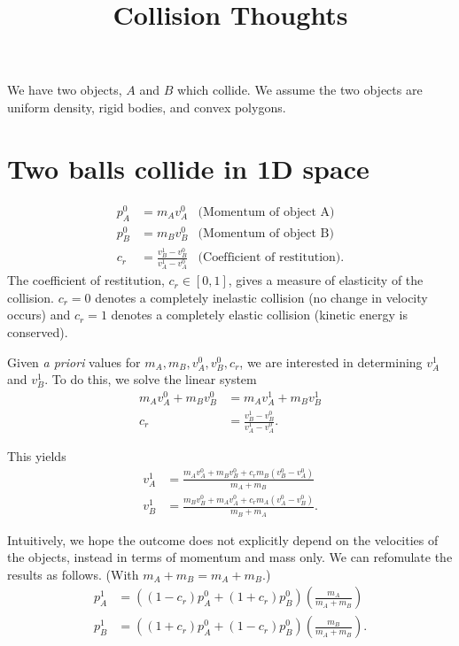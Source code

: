 \documentclass[a4paper,11pt, oneside]{article}
\title{Collision Thoughts}
\newcommand{\mtot}{m_A + m_B}
\begin{document}
\maketitle

We have two objects, $A$ and $B$ which collide.  We assume the two objects are uniform density, rigid bodies, and convex polygons.

\section{Two balls collide in 1D space}
\begin{align*}
    p_A^{0} &= m_Av_A^0 & \text{(Momentum of object A)}\\
    p_B^{0} &= m_Bv_B^0 & \text{(Momentum of object B)}\\
    c_r &= \frac{v_B^1 - v_B^0}{v_A^1 - v_A^0}  &\text{(Coefficient of restitution)}.
\end{align*}
The coefficient of restitution, $c_r\in[0,1]$, gives a measure of elasticity of the collision. $c_r = 0$ denotes a completely inelastic collision (no change in velocity occurs) and $c_r = 1$ denotes a completely elastic collision (kinetic energy is conserved).

Given \emph{a priori} values for $m_A, m_B, v_A^0, v_B^0, c_r$, we are interested in determining $v_A^1$ and $v_B^1$.  To do this, we solve the linear system
\begin{align*}
    m_Av_A^0 + m_Bv_B^0 &= m_Av_A^1 + m_Bv_B^1\\
    c_r &= \frac{v_B^1 - v_B^0}{v_A^1 - v_A^0}.
\end{align*}

This yields
\begin{align*}
    v_A^1 &= \frac{m_Av_A^0 + m_Bv_B^0 + c_r m_B (v_B^0 - v_A^0)}{m_A + m_B}\\
    v_B^1 &= \frac{m_Bv_B^0 + m_Av_A^0 + c_r m_A (v_A^0 - v_B^0)}{m_B + m_A}.
\end{align*}

Intuitively, we hope the outcome does not explicitly depend on the velocities of the objects, instead in terms of momentum and mass only.  We can refomulate the results as follows.  (With $\mtot = m_A + m_B$.)
\begin{align*}
    p_A^1 &= \left((1-c_r)p_A^0 + (1+c_r)p_B^0\right)\left(\frac{m_A}{\mtot}\right)\\
    p_B^1 &= \left((1+c_r)p_A^0 + (1-c_r)p_B^0\right)\left(\frac{m_B}{\mtot}\right).
\end{align*}
\end{document}
